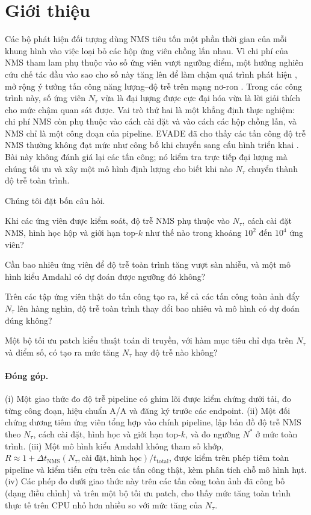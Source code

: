 \documentclass[a4paper,fleqn]{cas-dc}
\newcommand{\Ntau}{N_{\tau}}
\begin{document}
\section{Giới thiệu}
Các bộ phát hiện đối tượng dùng NMS tiêu tốn một phần thời gian của mỗi khung hình vào việc loại bỏ các hộp ứng viên chồng lấn nhau. Vì chi phí của NMS tham lam phụ thuộc vào số ứng viên vượt ngưỡng điểm, một hướng nghiên cứu chế tác đầu vào sao cho số này tăng lên để làm chậm quá trình phát hiện \cite{phantom2023,overload2024}, mở rộng ý tưởng tấn công năng lượng--độ trễ trên mạng nơ-ron \cite{shumailov2021sponge}. Trong các công trình này, số ứng viên $\Ntau$ vừa là đại lượng được cực đại hóa vừa là lời giải thích cho mức chậm quan sát được. Vai trò thứ hai là một khẳng định thực nghiệm: chi phí NMS còn phụ thuộc vào cách cài đặt và vào cách các hộp chồng lấn, và NMS chỉ là một công đoạn của pipeline. EVADE đã cho thấy các tấn công độ trễ NMS thường không đạt mức như công bố khi chuyển sang cấu hình triển khai \cite{evade2025}. Bài này không đánh giá lại các tấn công; nó kiểm tra trực tiếp đại lượng mà chúng tối ưu và xây một mô hình định lượng cho biết khi nào $\Ntau$ chuyển thành độ trễ toàn trình.

Chúng tôi đặt bốn câu hỏi.
\begin{description}[leftmargin=2.5em,labelwidth=2.2em,itemsep=2pt]
\item[Q1] Khi các ứng viên được kiểm soát, độ trễ NMS phụ thuộc vào $\Ntau$, cách cài đặt NMS, hình học hộp và giới hạn top-$k$ như thế nào trong khoảng $10^2$ đến $10^4$ ứng viên?
\item[Q2] Cần bao nhiêu ứng viên để độ trễ toàn trình tăng vượt sàn nhiễu, và một mô hình kiểu Amdahl có dự đoán được ngưỡng đó không?
\item[Q3] Trên các tập ứng viên thật do tấn công tạo ra, kể cả các tấn công toàn ảnh đẩy $\Ntau$ lên hàng nghìn, độ trễ toàn trình thay đổi bao nhiêu và mô hình có dự đoán đúng không?
\item[Q4] Một bộ tối ưu patch kiểu thuật toán di truyền, với hàm mục tiêu chỉ dựa trên $\Ntau$ và điểm số, có tạo ra mức tăng $\Ntau$ hay độ trễ nào không?
\end{description}

\paragraph{Đóng góp.}
(i) Một giao thức đo độ trễ pipeline có ghim lõi được kiểm chứng dưới tải, đo từng công đoạn, hiệu chuẩn A/A và đăng ký trước các endpoint. (ii) Một đối chứng dương tiêm ứng viên tổng hợp vào chính pipeline, lập bản đồ độ trễ NMS theo $\Ntau$, cách cài đặt, hình học và giới hạn top-$k$, và đo ngưỡng $N^{*}$ ở mức toàn trình. (iii) Một mô hình kiểu Amdahl không tham số khớp, $R \approx 1 + \Delta t_{\mathrm{NMS}}(\Ntau, \text{cài đặt}, \text{hình học})/t_{\mathrm{total}}$, được kiểm trên phép tiêm toàn pipeline và kiểm tiến cứu trên các tấn công thật, kèm phân tích chỗ mô hình hụt. (iv) Các phép đo dưới giao thức này trên các tấn công toàn ảnh đã công bố (dạng điều chỉnh) và trên một bộ tối ưu patch, cho thấy mức tăng toàn trình thực tế trên CPU nhỏ hơn nhiều so với mức tăng của $\Ntau$.
\end{document}
